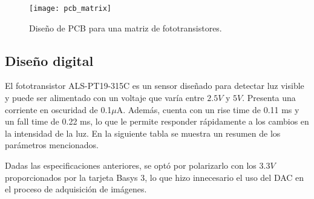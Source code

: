             \begin{figure}[hbtp]
                \centering
                \texttt{[image: pcb\_matrix]}
                \caption{Diseño de PCB para una matriz de fototransistores.}
                \label{fig:pcb_matrix}
            \end{figure}

\subsection{Diseño digital}
El fototransistor ALS-PT19-315C es un sensor diseñado para detectar luz visible y puede ser alimentado con un voltaje que varía entre $2.5V$ y $5V$. Presenta una corriente en oscuridad de 0.1$\mu$A. Además, cuenta con un rise time de 0.11 ms y un fall time de 0.22 ms, lo que le permite responder rápidamente a los cambios en la intensidad de la luz. En la siguiente tabla se muestra un resumen de los parámetros mencionados.

            \begin{table}[htbp]
                \caption{Parámetros del fototransistor ALS-PT19-315C}
                \begin{center}
                \label{tab:als_param}
                \end{center}
            \end{table}

Dadas las especificaciones anteriores, se optó por polarizarlo con los $3.3V$ proporcionados por la tarjeta Basys 3, lo que hizo innecesario el uso del DAC en el proceso de adquisición de imágenes.


